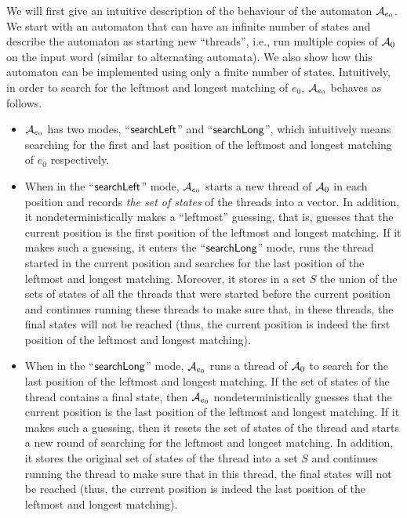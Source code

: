 %
We will first give an intuitive description of the behaviour of the automaton $\mathcal{A}_{e_0}$.
We start with an automaton that can have an infinite number of states and describe the automaton as starting new ``threads'', i.e., run multiple copies of $\mathcal{A}_0$ on the input word (similar to alternating automata).
We also show how this automaton can be implemented using only a finite number of states.
Intuitively, in order to search for the leftmost and longest matching of $e_0$, $\mathcal{A}_{e_0}$ behaves as follows.
\begin{itemize}
\item $\mathcal{A}_{e_0}$ has two modes, ``$\mathsf{searchLeft}$'' and ``$\mathsf{searchLong}$'', which intuitively means searching  for the first and last position of the leftmost and longest matching of $e_0$ respectively.
	\item When in the ``$\mathsf{searchLeft}$'' mode, $\mathcal{A}_{e_0}$ starts a new thread of $\mathcal{A}_0$ in each position and records \emph{the set of states} of the threads into a vector.
    In addition, it nondeterministically makes a ``leftmost'' guessing, that is, guesses that the current position is the first position of the leftmost and longest matching.
    If it makes such a guessing, it enters the ``$\mathsf{searchLong}$'' mode, runs the thread started in the current position and searches for the last position of the leftmost and longest matching.
    Moreover, it stores in a set $S$ the union of the sets of states of all the threads that were started before the current position and continues running these threads to make sure that, in these threads, the final states will not be reached (thus, the current position is indeed the first position of the leftmost and longest matching).
	\item When in the ``$\mathsf{searchLong}$'' mode, $\mathcal{A}_{e_0}$ runs a thread of $\mathcal{A}_{0}$ to search for the last position of the leftmost and longest matching.
    If the set of states of the thread contains a final state, then $\mathcal{A}_{e_0}$ nondeterministically guesses that the current position is the last position of the leftmost and longest matching.
    If it makes such a guessing, then it resets the set of states of the thread and starts a new round of searching for the leftmost and longest matching.
    In addition, it stores the original set of states of the thread into a set $S$ and continues running the thread to make sure that in this thread, the final states  will not be reached (thus, the current position is indeed the last position of the leftmost and longest matching).

\end{itemize}

